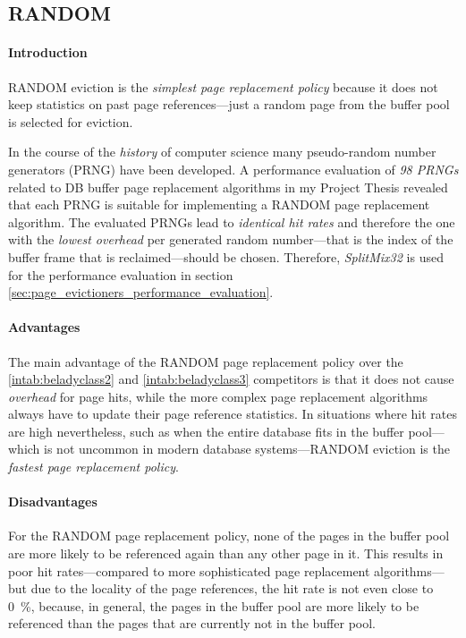 \subsection{RANDOM} \label{subsec:random}

\paragraph{Introduction}

    RANDOM eviction is the \emph{simplest page replacement policy} because it does not keep statistics on past page references---just a random page from the buffer pool is selected for eviction.
    
    In the course of the \emph{history} of computer science many pseudo-random number generators (PRNG) have been developed. A performance evaluation of \emph{98 PRNGs} related to DB buffer page replacement algorithms in my Project Thesis \cite{Gilbert:2020} revealed that each PRNG is suitable for implementing a RANDOM page replacement algorithm. The evaluated PRNGs lead to \emph{identical hit rates} and therefore the one with the \emph{lowest overhead} per generated random number---that is the index of the buffer frame that is reclaimed---should be chosen. Therefore, \emph{SplitMix32} is used for the performance evaluation in section \ref{sec:page_evictioners_performance_evaluation}.

\paragraph{Advantages}

    The main advantage of the RANDOM page replacement policy over the \ref{intab:beladyclass2} and \ref{intab:beladyclass3} competitors is that it does not cause \emph{overhead} for page hits, while the more complex page replacement algorithms always have to update their page reference statistics. In situations where hit rates are high nevertheless, such as when the entire database fits in the buffer pool---which is not uncommon in modern database systems---RANDOM eviction is the \emph{fastest page replacement policy}.

\paragraph{Disadvantages}

    For the RANDOM page replacement policy, none of the pages in the buffer pool are more likely to be referenced again than any other page in it. This results in poor hit rates---compared to more sophisticated page replacement algorithms---but due to the locality of the page references, the hit rate is not even close to \SI{0}{\percent}, because, in general, the pages in the buffer pool are more likely to be referenced than the pages that are currently not in the buffer pool.


